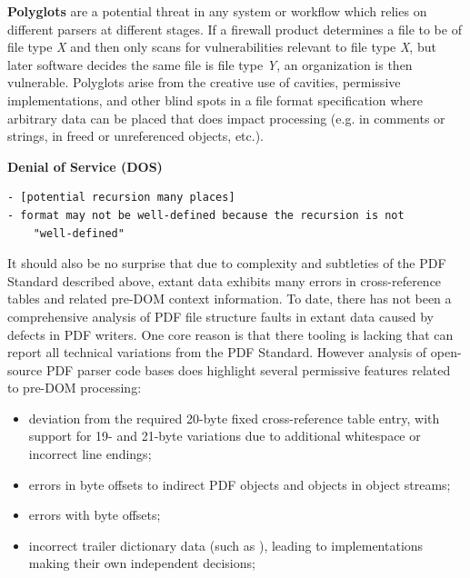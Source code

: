{\bf{Polyglots}} are a potential threat in any system or workflow which relies on different parsers
at different stages. If a firewall product determines a file to be of file type \emph{X} and then only 
scans for vulnerabilities relevant to file type \emph{X}, but later software decides the same file 
is file type \emph{Y}, an organization is then vulnerable. Polyglots arise from the creative use of
cavities, permissive implementations, 
and other blind spots in a file format specification where arbitrary data can be placed 
that does impact processing (e.g. in comments or strings, in freed or unreferenced objects, etc.).

{\bf{Denial of Service (DOS)}} 
%
\begin{lstlisting}[style=meta]
- [potential recursion many places]
- format may not be well-defined because the recursion is not
    "well-defined"
\end{lstlisting}

It should also be no surprise that due to complexity and subtleties of the PDF Standard described above,
extant data exhibits many errors in cross-reference tables and related pre-DOM context information.
To date, there has not been a comprehensive analysis of PDF file structure faults in extant data
caused by defects in PDF writers. One core reason is that there tooling is lacking that can report
all technical variations from the PDF Standard. However analysis of open-source PDF parser code bases
does highlight several permissive features related to pre-DOM processing:

\begin{itemize}
    \item deviation from the required 20-byte fixed cross-reference table entry, with support for
    19- and 21-byte variations due to additional whitespace or incorrect line endings;
    \item errors in byte offsets to indirect PDF objects and objects in object streams;
    \item errors with  byte offsets;
    \item incorrect trailer dictionary data (such as ), leading to implementations 
    making their own independent decisions;  
\end{itemize}
